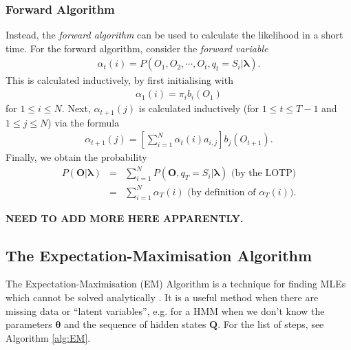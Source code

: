 \documentclass[12pt]{article}
\begin{document}
\subsubsection{Forward Algorithm}\label{sssec:for_back_alg}
Instead, the \emph{forward algorithm} can be used to calculate the likelihood in a short time. For the forward algorithm, consider the \emph{forward variable}
\begin{eqnarray}
  \alpha_t(i)=P(O_1,O_2,\cdots,O_t,q_t=S_i|\bm{\lambda}).
\end{eqnarray}
This is calculated inductively, by first initialising with
\begin{eqnarray}
  \alpha_1(i)=\pi_ib_i(O_1)
\end{eqnarray}
for $1\le i \le N$. Next, $\alpha_{t+1}(j)$ is calculated inductively (for $1\le t \le T-1$ and $1\le j \le N$) via the formula
\begin{eqnarray}
  \alpha_{t+1}(j)=\left[\sum_{i=1}^N\alpha_t(i)a_{i,j} \right]b_j(O_{t+1}).
\end{eqnarray}
Finally, we obtain the probability
\begin{eqnarray}
  P(\bm{O}|\bm{\lambda})&=&\sum_{i=1}^NP(\bm{O},q_T=S_i|\bm{\lambda})\text{ (by the LOTP)}  \nonumber \\
  &=&  \sum_{i=1}^N\alpha_T(i) \text{ (by definition of $\alpha_T(i)$)}.
\end{eqnarray}

\textbf{NEED TO ADD MORE HERE APPARENTLY.}





\subsection{The Expectation-Maximisation Algorithm}\label{ssec:EM-Alg}
The Expectation-Maximisation (EM) Algorithm is a technique for finding MLEs which cannot be solved analytically \cite{bishop1986maximum}. It is a useful method when there are missing data or ``latent variables'', e.g. for a HMM when we don't know the parameters $\bm{\theta}$ and the sequence of hidden states $\bm{Q}$. For the list of steps, see Algorithm \ref{alg:EM}.
\end{document}
